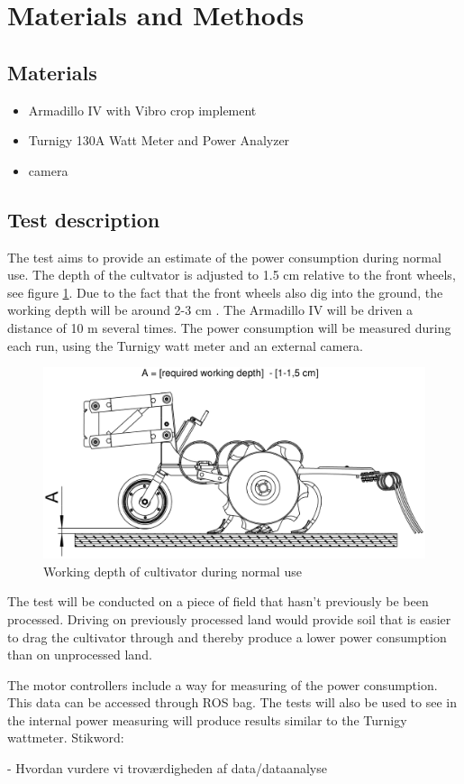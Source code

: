 \section{Materials and Methods}
\subsection{Materials}\label{Materials}
\begin{itemize}
	\item Armadillo IV with Vibro crop implement
	\item Turnigy 130A Watt Meter and Power Analyzer
	\item camera
\end{itemize}
\subsection{Test description}
The test aims to provide an estimate of the power consumption during normal use. The depth of the cultvator is adjusted to 1.5 cm relative to the front wheels, see figure \ref{fig:vibro_crop_working_depth}. Due to the fact that the front wheels also dig into the ground, the working depth will be around 2-3 cm \cite{vibro_crop}. The Armadillo IV will be driven a distance of 10 m several times. The power consumption will be measured during each run, using the Turnigy watt meter and an external camera.  
\begin{figure}[hbtp]
	\centering
	\includegraphics[width=0.7\linewidth]{./images/vibro_crop_working_depth}
	\caption{Working depth of cultivator during normal use \cite{vibro_crop}}
	\label{fig:vibro_crop_working_depth}
\end{figure}
 
The test will be conducted on a piece of field that hasn't previously be been processed. Driving on previously processed land would provide soil that is easier to drag the cultivator through and thereby produce a lower power consumption than on unprocessed land. 

The motor controllers include a way for measuring of the power consumption. This data can be accessed through ROS bag. The tests will also be used to see in the internal power measuring will produce results similar to the Turnigy wattmeter.
Stikword:

	- Hvordan vurdere vi troværdigheden af data/dataanalyse
